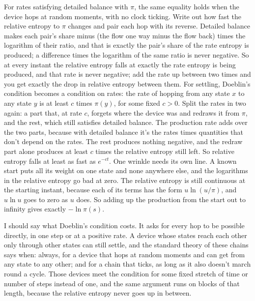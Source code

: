 \documentclass[11pt,twoside]{article}
\theoremstyle{thielethm}
\theoremstyle{thieledef}
\theoremstyle{thieledef}
\theoremstyle{thieledef}
\theoremstyle{thielethm}
\theoremstyle{thieleobs}
\theoremstyle{thielethm}
\begin{document}
For rates satisfying detailed balance with $\pi$, the same equality holds when the device
hops at random moments, with no clock ticking. Write out how fast the relative entropy to $\pi$
changes and pair each hop with its reverse. Detailed balance makes each pair's share minus
(the flow one way minus the flow back) times the logarithm of their ratio, and that is exactly
the pair's share of the rate entropy is produced; a difference times the logarithm of the same
ratio is never negative. So at every instant the relative entropy falls at exactly the rate
entropy is being produced, and that rate is never negative; add the rate up between two times
and you get exactly the drop in relative entropy between them. For settling, Doeblin's condition
becomes a condition on rates: the rate of hopping from any state $x$ to any state $y$ is at least
$c$ times $\pi(y)$, for some fixed $c > 0$. Split the rates in two again: a part that, at rate
$c$, forgets where the device was and redraws it from $\pi$, and the rest, which still satisfies
detailed balance. The production rate adds over the two parts, because with detailed balance it's
the rates times quantities that don't depend on the rates. The rest produces nothing negative,
and the redraw part alone produces at least $c$ times the relative entropy still left. So
relative entropy falls at least as fast as $e^{-ct}$. One wrinkle needs its own line. A known
start puts all its weight on one state and none anywhere else, and the logarithms in the
relative entropy go bad at zero. The relative entropy is still continuous at the starting
instant, because each of its terms has the form $u \ln (u/\pi)$, and $u \ln u$ goes to zero as
$u$ does. So adding up the production from the start out to infinity gives exactly
$-\ln\pi(s)$.

I should say what Doeblin's condition costs. It asks for every hop to be possible directly, in
one step or at a positive rate. A device whose states reach each other only through other states
can still settle, and the standard theory of these chains says when: always, for a device that
hops at random moments and can get from any state to any other; and for a chain that ticks, as
long as it also doesn't march round a cycle. Those devices meet the condition for some fixed
stretch of time or number of steps instead of one, and the same argument runs on blocks of that
length, because the relative entropy never goes up in between.
\end{document}
